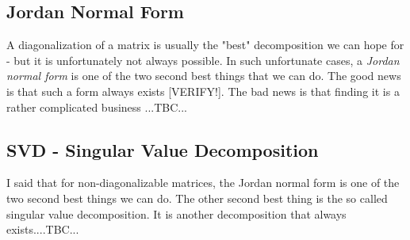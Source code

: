 


\subsection{Jordan Normal Form}
A diagonalization of a matrix is usually the "best" decomposition we can hope for - but it is unfortunately not always possible. In such unfortunate cases, a \emph{Jordan normal form} is one of the two second best things that we can do. The good news is that such a form always exists [VERIFY!]. The bad news is that finding it is a rather complicated business ...TBC...










\subsection{SVD - Singular Value Decomposition}

I said that for non-diagonalizable matrices, the Jordan normal form is one of the two second best things we can do. The other second best thing is the so called singular value decomposition. It is another decomposition that always exists....TBC...

